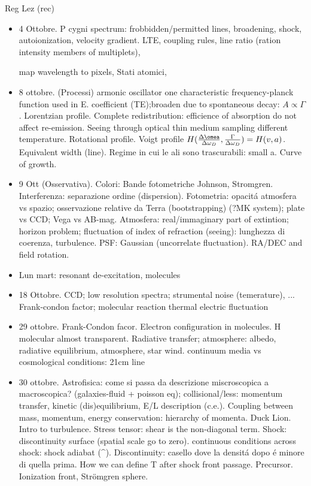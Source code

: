 \begin{frame}[allowframebreaks]{Reg Lez (rec)}

\begin{itemize}
\item 4 Ottobre. P cygni spectrum: frobbidden/permitted lines, broadening, shock, autoionization, velocity gradient.
LTE, coupling rules, line ratio (ration intensity members of multiplets),

 map wavelength to pixels, Stati atomici,
\item 8 ottobre. (Processi) armonic oscillator one characteristic frequency-planck function used in E. coefficient  (TE);broaden due to spontaneous decay: $A\propto\Gamma$. Lorentzian profile. Complete redistribution: efficience of absorption do not affect re-emission.
Seeing through optical thin medium sampling different temperature. Rotational profile. Voigt profile $H(\frac{\Delta\omea}{\Delta\omega_D},\frac{\Gamma}{\Delta\omega_D})=H(v,a)$. Equivalent width (line). Regime in cui le ali sono trascurabili: small a. Curve of growth.
\item 9 Ott (Osservativa). Colori: Bande fotometriche Johnson, Str\:omgren. Interferenza: separazione ordine (dispersion). Fotometria: opacit\'a atmosfera vs spazio; osservazione relative da Terra (bootstrapping) (?MK system); plate vs CCD; Vega vs AB-mag. Atmosfera: real/immaginary part of extintion; horizon problem; fluctuation of index of refraction (seeing): lunghezza di coerenza, turbulence. PSF: Gaussian (uncorrelate fluctuation). RA/DEC and field rotation.

\item Lun mart: resonant de-excitation, molecules

\item 18 Ottobre. CCD; low resolution spectra; strumental noise (temerature), ...
Frank-condon factor; molecular reaction
thermal electric fluctuation
\item 29 ottobre. Frank-Condon facor. Electron configuration in molecules. H molecular almost transparent. Radiative transfer; atmosphere: albedo, radiative equilibrium, atmosphere, star wind.
continuum media vs cosmological conditions: 21cm line
\item 30 ottobre. Astrofisica: come si passa da descrizione miscroscopica a macroscopica? (galaxies-fluid + poisson eq); collisional/less: momentum transfer, kinetic (dis)equilibrium, E/L description (c.e.). Coupling between mass, momentum, energy conservation: hierarchy of momenta. Duck Lion. Intro to turbulence. Stress tensor: shear is the non-diagonal term. Shock: discontinuity surface (spatial scale go to zero). continuous conditions across shock: shock adiabat ($\^$). Discontinuity: casello dove la densit\'a dopo \'e minore di quella prima. How we can define T after shock front passage. Precursor. Ionization front, Str\"omgren sphere.


\end{itemize}
\end{frame}

